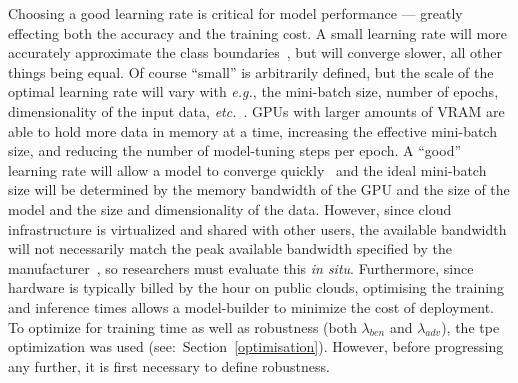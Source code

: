 \documentclass[sn-mathphys-num]{sn-jnl}%
\begin{document}
Choosing a good learning rate is critical for model performance --- greatly effecting both the accuracy and the training cost.
A small learning rate will more accurately approximate the class boundaries~\cite{cao2019generalization}, but will converge slower, all other things being equal.
Of course ``small'' is arbitrarily defined, but the scale of the optimal learning rate will vary with \textit{e.g.}, the mini-batch size, number of epochs, dimensionality of the input data, \textit{etc.}~\cite{granziol2022learning}.
GPUs with larger amounts of VRAM are able to hold more data in memory at a time, increasing the effective mini-batch size, and reducing the number of model-tuning steps per epoch.
A ``good'' learning rate will allow a model to converge quickly~\cite{smith2019super,granziol2022learning} and the ideal mini-batch size will be determined by the memory bandwidth of the GPU and the size of the model and the size and dimensionality of the data.
However, since cloud infrastructure is virtualized and shared with other users, the available bandwidth will not necessarily match the peak available bandwidth specified by the manufacturer~\cite{sajid2013cloud}, so researchers must evaluate this \textit{in situ}.
Furthermore, since hardware is typically billed by the hour on public clouds, optimising the training and inference times allows a model-builder to minimize the cost of deployment. To optimize for training time as well as robustness (both $\lambda_{ben}$ and $\lambda_{adv}$), the \acrshort{tpe} optimization was used (see:~Section~\ref{optimisation}).
However, before progressing any further, it is first necessary to define robustness.
\end{document}
